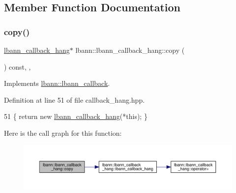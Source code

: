 \subsection{Member Function Documentation}
\mbox{\label{classlbann_1_1lbann__callback__hang_a047660bd517f5c669c8e2abc4f2e951f}} 
\subsubsection{\texorpdfstring{copy()}{copy()}}
{\footnotesize\ttfamily \hyperlink{classlbann_1_1lbann__callback__hang}{lbann\+\_\+callback\+\_\+hang}$\ast$ lbann\+::lbann\+\_\+callback\+\_\+hang\+::copy (\begin{DoxyParamCaption}{ }\end{DoxyParamCaption}) const\hspace{0.3cm}{\ttfamily [inline]}, {\ttfamily [override]}, {\ttfamily [virtual]}}



Implements \hyperlink{classlbann_1_1lbann__callback_a9f545d1269a8c7af335625d049691f26}{lbann\+::lbann\+\_\+callback}.



Definition at line 51 of file callback\+\_\+hang.\+hpp.


\begin{DoxyCode}
51 \{ \textcolor{keywordflow}{return} \textcolor{keyword}{new} \hyperlink{classlbann_1_1lbann__callback__hang_af5e29a2d416e3268a495df8370b272b6}{lbann\_callback\_hang}(*\textcolor{keyword}{this}); \}
\end{DoxyCode}
Here is the call graph for this function\+:\nopagebreak
\begin{figure}[H]
\begin{center}
\leavevmode
\includegraphics[width=350pt]{classlbann_1_1lbann__callback__hang_a047660bd517f5c669c8e2abc4f2e951f_cgraph}
\end{center}
\end{figure}
\mbox{\label{classlbann_1_1lbann__callback__hang_a3aa4a28d16f21dd6bd86fd6ebaa0e0fa}} 
